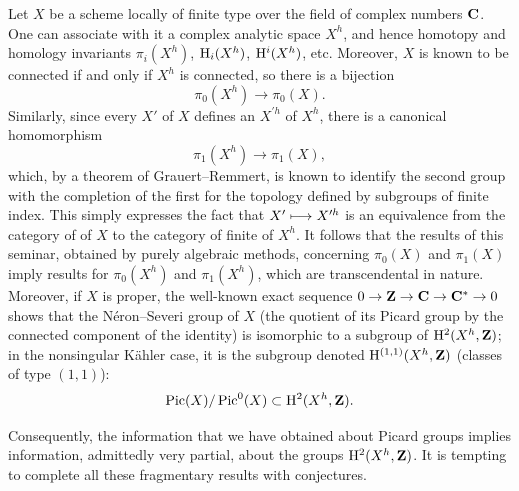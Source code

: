 Let $X$ be a scheme locally of
finite type over the field of complex numbers $\mathbf C$. One can associate
with it a complex analytic space $X^h$, and hence homotopy and homology
invariants $\pi_i(X^h)$, $\mathrm H_i(X^h)$, $\mathrm H^i(X^h)$, etc.
\sisi{\dotsc}{} Moreover, $X$ is known to be connected if and only if
$X^h$ is connected, so there is a bijection
$$
\pi_0(X^h)\to \pi_0(X).
$$
Similarly, since every  $X'$ of
$X$ defines an  $X^{\prime h}$ of
$X^h$\pageoriginale, there is a canonical homomorphism
$$
\pi_1(X^h)\to \pi_1(X),
$$
which, by a theorem of Grauert--Remmert, is known to identify the second
group with the completion of the first for the topology defined by
subgroups of finite index. This simply expresses the fact that
$X'\longmapsto X^{\prime h}$ is an equivalence from the
category of  of $X$ to the
category of finite  of $X^h$.
It follows that the results of this seminar, obtained by purely
algebraic methods, concerning $\pi_0(X)$ and $\pi_1(X)$ imply results
for $\pi_0(X^h)$ and $\pi_1(X^h)$, which are transcendental in nature.
Moreover, if $X$ is proper, the well-known exact sequence
$0\to\mathbf Z\to\mathbf C\to\mathbf C^*\to0$ shows that the N\'eron--Severi group of $X$
(the quotient of its Picard group by the connected component of the
identity) is isomorphic to a subgroup of $\mathrm H^2(X^h,\mathbf Z)$; in the
nonsingular K\"ahler case, it is the subgroup denoted
$\mathrm H^{(1,1)}(X^h,\mathbf Z)$ (classes of type $(1,1)$):
$$
\operatorname{Pic}(X)/\operatorname{Pic}^0(X)\subset \mathrm H^2(X^h,\mathbf Z).
$$

Consequently, the information that we have obtained about Picard groups
implies information, admittedly very partial, about the groups
$\mathrm H^2(X^h,\mathbf Z)$. It is tempting to complete all these fragmentary
results with conjectures.

